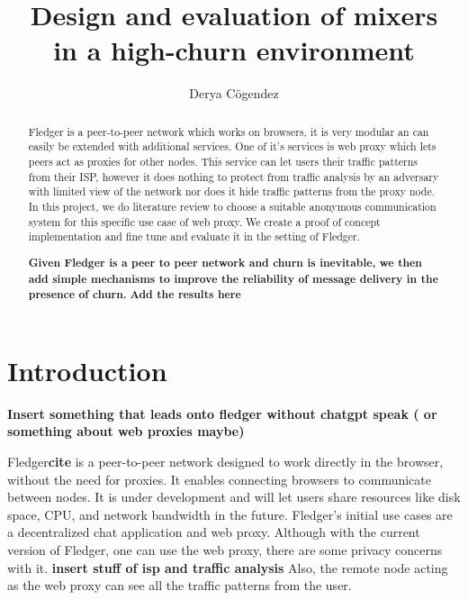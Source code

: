 \documentclass[a4paper,11pt,oneside]{report}
\title{Design and evaluation of mixers\\in a high-churn environment}
\author{Derya Cögendez}
\begin{document}
\maketitle
\makeacks

\begin{abstract}
Fledger is a peer-to-peer network which works on browsers, it is very modular an can easily be extended with additional services. One of it's services is web proxy which lets peers act as proxies for other nodes. This service can let users their traffic patterns from their ISP, however it does nothing to protect from traffic analysis by an adversary with limited view of the network nor does it hide traffic patterns from the proxy node. In this project, we do literature review to choose a suitable anonymous communication system for this specific use case of web proxy. We create a proof of concept implementation and fine tune and evaluate it in the setting of Fledger. 


\textbf{Given Fledger is a peer to peer network and churn is inevitable, we then add simple mechanisms to improve the reliability of message delivery in the presence of churn.} 
\textbf{Add the results here}
\end{abstract}

\maketoc

\chapter{Introduction}

\textbf{Insert something that leads onto fledger without chatgpt speak ( or something about web proxies maybe)}

Fledger\textbf{cite} is a peer-to-peer network designed to work directly in the browser, without the need for proxies. It enables connecting browsers to communicate between nodes. It is under development and will let users share resources like disk space, CPU, and network bandwidth in the future. Fledger's initial use cases are a decentralized chat application and web proxy. Although with the current version of Fledger, one can use the web proxy, there are some privacy concerns with it. \textbf{insert stuff of isp and traffic analysis} Also, the remote node acting as the web proxy can see all the traffic patterns from the user. 
\end{document}

